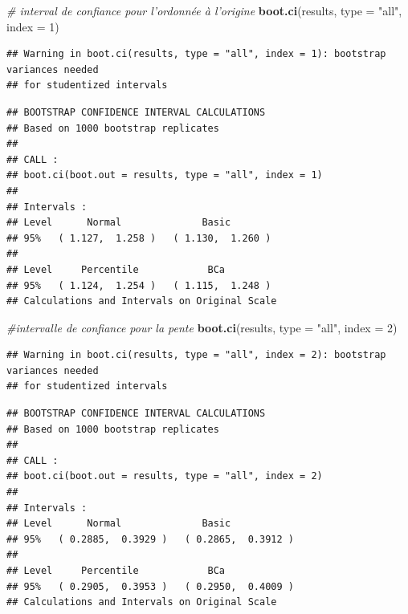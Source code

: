\documentclass[12pt,]{book}
\newenvironment{Shaded}{\begin{snugshade}}{\end{snugshade}}
\newcommand{\CommentTok}[1]{\textcolor[rgb]{0.56,0.35,0.01}{\textit{#1}}}
\newcommand{\DataTypeTok}[1]{\textcolor[rgb]{0.13,0.29,0.53}{#1}}
\newcommand{\DecValTok}[1]{\textcolor[rgb]{0.00,0.00,0.81}{#1}}
\newcommand{\KeywordTok}[1]{\textcolor[rgb]{0.13,0.29,0.53}{\textbf{#1}}}
\newcommand{\NormalTok}[1]{#1}
\newcommand{\StringTok}[1]{\textcolor[rgb]{0.31,0.60,0.02}{#1}}
\begin{document}
\begin{Shaded}
\begin{Highlighting}[]
\CommentTok{# interval de confiance pour l'ordonnée à l'origine}
\KeywordTok{boot.ci}\NormalTok{(results, }\DataTypeTok{type =} \StringTok{"all"}\NormalTok{, }\DataTypeTok{index =} \DecValTok{1}\NormalTok{)}
\end{Highlighting}
\end{Shaded}

\begin{verbatim}
## Warning in boot.ci(results, type = "all", index = 1): bootstrap variances needed
## for studentized intervals
\end{verbatim}

\begin{verbatim}
## BOOTSTRAP CONFIDENCE INTERVAL CALCULATIONS
## Based on 1000 bootstrap replicates
## 
## CALL : 
## boot.ci(boot.out = results, type = "all", index = 1)
## 
## Intervals : 
## Level      Normal              Basic         
## 95%   ( 1.127,  1.258 )   ( 1.130,  1.260 )  
## 
## Level     Percentile            BCa          
## 95%   ( 1.124,  1.254 )   ( 1.115,  1.248 )  
## Calculations and Intervals on Original Scale
\end{verbatim}

\begin{Shaded}
\begin{Highlighting}[]
\CommentTok{#intervalle de confiance pour la pente}
\KeywordTok{boot.ci}\NormalTok{(results, }\DataTypeTok{type =} \StringTok{"all"}\NormalTok{, }\DataTypeTok{index =} \DecValTok{2}\NormalTok{)}
\end{Highlighting}
\end{Shaded}

\begin{verbatim}
## Warning in boot.ci(results, type = "all", index = 2): bootstrap variances needed
## for studentized intervals
\end{verbatim}

\begin{verbatim}
## BOOTSTRAP CONFIDENCE INTERVAL CALCULATIONS
## Based on 1000 bootstrap replicates
## 
## CALL : 
## boot.ci(boot.out = results, type = "all", index = 2)
## 
## Intervals : 
## Level      Normal              Basic         
## 95%   ( 0.2885,  0.3929 )   ( 0.2865,  0.3912 )  
## 
## Level     Percentile            BCa          
## 95%   ( 0.2905,  0.3953 )   ( 0.2950,  0.4009 )  
## Calculations and Intervals on Original Scale
\end{verbatim}
\end{document}
